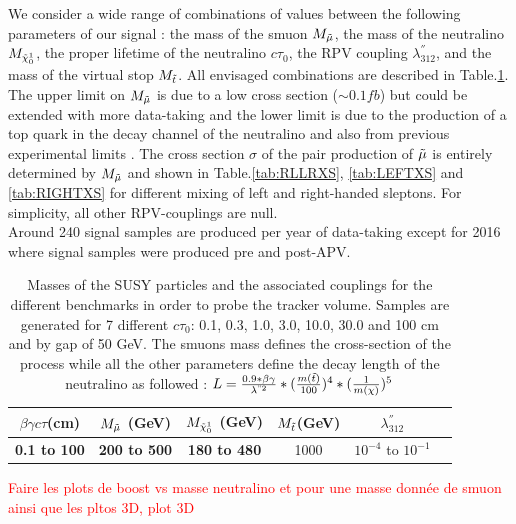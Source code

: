 \documentclass{cernatlasnote}
\begin{document}
We consider a wide range of combinations of values between the following parameters of our signal :
the mass of the smuon $M_{\Tilde{\mu}}$, the mass of the neutralino $M_{\Tilde{\chi}_{0}^{1}}$, the proper lifetime of the neutralino $c\tau_{0}$, the RPV coupling $\lambda^{''}_{312}$, and the mass of the virtual stop $M_{\Tilde{t}}$. All envisaged combinations are described in Table.\ref{tab:TAB1}. The upper limit on $M_{\Tilde{\mu}}$ is due to a low cross section ($\sim 0.1fb$) but could be extended with more data-taking and the lower limit is due to the production of a top quark in the decay channel of the neutralino and also from previous experimental limits \cite{ATLAS1,ATLAS2,ATLAS3,CMS1,ATLAS4,CMS2,ATLAS5}. The cross section $\sigma$ of the pair production of $\Tilde{\mu}$ is entirely determined by $M_{\Tilde{\mu}}$ and shown in Table.\ref{tab:RLLRXS},  \ref{tab:LEFTXS} and \ref{tab:RIGHTXS} for different mixing of left and right-handed sleptons. For simplicity, all other RPV-couplings are null. \\
Around 240 signal samples are produced per year of data-taking except for 2016 where signal samples were produced pre and post-APV.
\begin{table}[h]
\centering
\begin{tabular}{|c|c|c|c|c|c|}
  \hline
  $\beta\gamma c\tau$(cm) & $M_{\Tilde{\mu}}$ (GeV) &  $M_{\Tilde{\chi}_{0}^{1}}$ (GeV) &  $M_{\Tilde{t}}$(GeV) &  $\lambda^{''}_{312}$ \\
  \hline
\textbf{0.1 to 100} & \textbf{200 to 500}  & \textbf{180 to 480}  & 1000 &  $10^{-4}$ to $10^{-1}$\\
  \hline
\end{tabular}
    \caption{Masses of the SUSY particles and the associated couplings for the different benchmarks in order to probe the tracker volume. Samples are generated for 7 different $c\tau_{0}$: 0.1, 0.3, 1.0, 3.0, 10.0, 30.0 and 100 cm and by gap of 50 GeV. The smuons mass defines the cross-section of the process while all the other parameters  define the decay length of the neutralino as followed : $ L = \frac{0.9*\beta\gamma}{\lambda^{"2}}*(\frac{m(\tilde{t})}{100})^{4}*(\frac{1}{m(\chi)})^{5}$}
    \label{tab:TAB1}
\end{table}
\textcolor{red}{Faire les plots de boost vs masse neutralino et pour une masse donnée de smuon ainsi que les pltos 3D, plot 3D}
\end{document}
